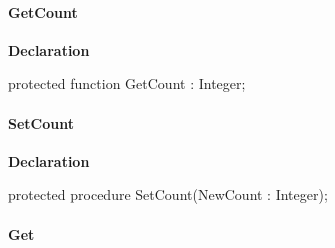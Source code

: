\documentclass{report}
\newif\ifpdf
\begin{document}
\paragraph*{GetCount}\hspace*{\fill}

\label{AbArcTyp.TAbArchiveList-GetCount}
\begin{list}{}{
\setlength{\itemindent}{0cm}
\setlength{\listparindent}{0cm}
\setlength{\leftmargin}{\evensidemargin}
\addtolength{\leftmargin}{\tmplength}
\settowidth{\labelsep}{X}
\addtolength{\leftmargin}{\labelsep}
\setlength{\labelwidth}{\tmplength}
}
\item[\textbf{Declaration}\hfill]
\ifpdf
\begin{flushleft}
\fi
\begin{ttfamily}
protected function GetCount : Integer;\end{ttfamily}

\ifpdf
\end{flushleft}
\fi

\end{list}
\paragraph*{SetCount}\hspace*{\fill}

\label{AbArcTyp.TAbArchiveList-SetCount}
\begin{list}{}{
\setlength{\itemindent}{0cm}
\setlength{\listparindent}{0cm}
\setlength{\leftmargin}{\evensidemargin}
\addtolength{\leftmargin}{\tmplength}
\settowidth{\labelsep}{X}
\addtolength{\leftmargin}{\labelsep}
\setlength{\labelwidth}{\tmplength}
}
\item[\textbf{Declaration}\hfill]
\ifpdf
\begin{flushleft}
\fi
\begin{ttfamily}
protected procedure SetCount(NewCount : Integer);\end{ttfamily}

\ifpdf
\end{flushleft}
\fi

\end{list}
\paragraph*{Get}\hspace*{\fill}
\end{document}
